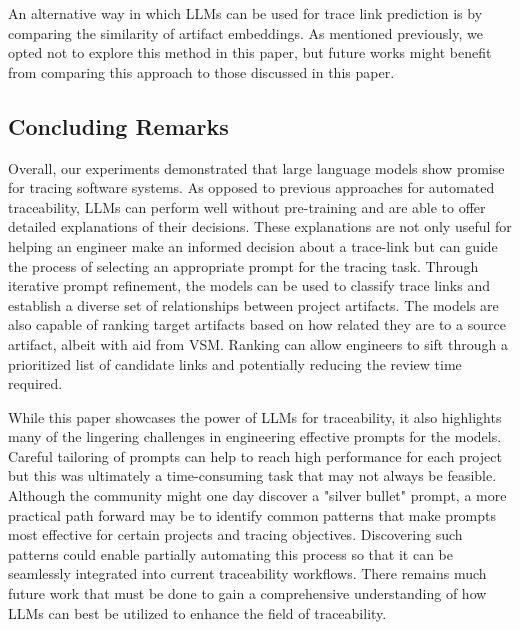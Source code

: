 An alternative way in which LLMs can be used for trace link prediction is by comparing the similarity of artifact embeddings. As mentioned previously, we opted not to explore this method in this paper, but future works might benefit from comparing this approach to those discussed in this paper.


\subsection{Concluding Remarks}
Overall, our experiments demonstrated that large language models show promise for tracing software systems. As opposed to previous approaches for automated traceability, LLMs can perform well without pre-training and are able to offer detailed explanations of their decisions. These explanations are not only useful for helping an engineer make an informed decision about a trace-link but can guide the process of selecting an appropriate prompt for the tracing task. Through iterative prompt refinement, the models can be used to classify trace links and establish a diverse set of relationships between project artifacts. The models are also capable of ranking target artifacts based on how related they are to a source artifact, albeit with aid from VSM. Ranking can allow engineers to sift through a prioritized list of candidate links and potentially reducing the review time required.

While this paper showcases the power of LLMs for traceability, it also highlights many of the lingering challenges in engineering effective prompts for the models. Careful tailoring of prompts can help to reach high performance for each project but this was ultimately a time-consuming task that may not always be feasible. Although the community might one day discover a "silver bullet" prompt, a more practical path forward may be to identify common patterns that make prompts most effective for certain projects and tracing objectives. Discovering such patterns could enable partially automating this process so that it can be seamlessly integrated into current traceability workflows. There remains much future work that must be done to gain a comprehensive understanding of how LLMs can best be utilized to enhance the field of traceability.


